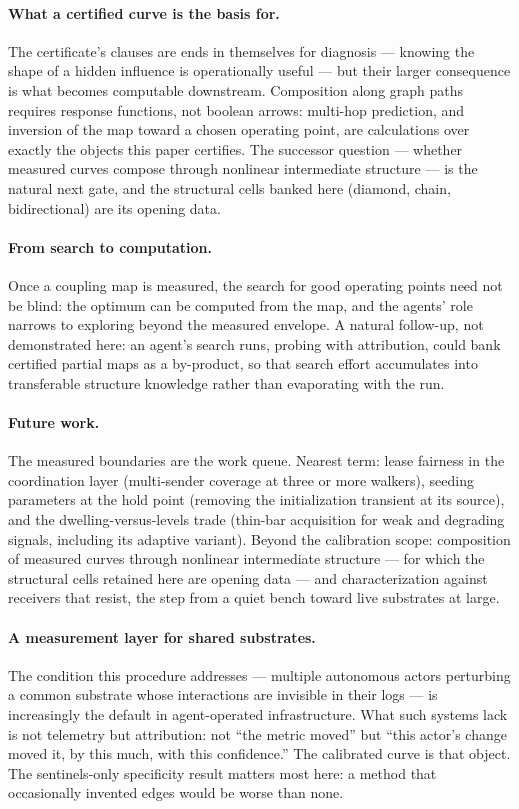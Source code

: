 \documentclass[11pt,a4paper]{article}
\begin{document}
\paragraph{What a certified curve is the basis for.}
The certificate's clauses are ends in themselves for diagnosis ---
knowing the shape of a hidden influence is operationally useful ---
but their larger consequence is what becomes computable downstream.
Composition along graph paths requires response functions, not
boolean arrows: multi-hop prediction, and inversion of the map
toward a chosen operating point, are calculations over exactly the
objects this paper certifies. The successor question --- whether
measured curves compose through nonlinear intermediate structure ---
is the natural next gate, and the structural cells banked here
(diamond, chain, bidirectional) are its opening data.

\paragraph{From search to computation.}
Once a coupling map is measured, the search for good operating
points need not be blind: the optimum can be computed from the map,
and the agents' role narrows to exploring beyond the measured
envelope. A natural follow-up, not demonstrated here: an agent's
search runs, probing with attribution, could bank certified partial maps
as a by-product, so that search effort accumulates into
transferable structure knowledge rather than evaporating with the
run.

\paragraph{Future work.}
The measured boundaries are the work queue. Nearest term: lease
fairness in the coordination layer (multi-sender coverage at three
or more walkers), seeding parameters at the hold point (removing
the initialization transient at its source), and the
dwelling-versus-levels trade (thin-bar acquisition for weak and
degrading signals, including its adaptive variant). Beyond the
calibration scope: composition of measured curves through nonlinear
intermediate structure --- for which the structural cells retained
here are opening data --- and characterization against receivers
that resist, the step from a quiet bench toward live substrates at
large.

\paragraph{A measurement layer for shared substrates.}
The condition this procedure addresses --- multiple autonomous
actors perturbing a common substrate whose interactions are
invisible in their logs --- is increasingly the default in
agent-operated infrastructure. What such systems lack is not
telemetry but attribution: not ``the metric moved'' but ``this
actor's change moved it, by this much, with this confidence.'' The
calibrated curve is that object. The sentinels-only specificity
result matters most here: a method that occasionally invented
edges would be worse than none.
\end{document}
